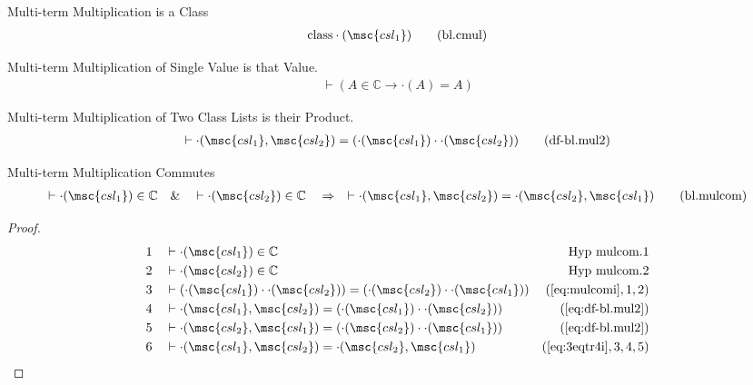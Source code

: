 \begin{metadefinition} Multi-term Multiplication is a Class
\begin{align}
{\rm class} \cdot( \msc{csl_1} )\label{eq:bl.cmul}\tag{bl.cmul}
\end{align}
\end{metadefinition}

\begin{metadefinition} Multi-term Multiplication of Single
Value is that Value.
\begin{align}
\vdash ( A \in \mathbb{C} \rightarrow \cdot( A ) = A
    )\label{eq:df-bl.mul1}\tag{df-bl.mul1}
\end{align}
\end{metadefinition}

\begin{metadefinition} Multi-term Multiplication of Two
Class Lists is their Product.
\begin{align}
\vdash \cdot( \msc{csl_1} , \msc{csl_2} ) = ( \cdot( \msc{csl_1} ) \cdot \cdot(
    \msc{csl_2} ) )\label{eq:df-bl.mul2}\tag{df-bl.mul2}
\end{align}
\end{metadefinition}

\begin{lemma} Multi-term Multiplication Commutes
\begin{align}
\vdash \cdot( \msc{csl_1} ) \in \mathbb{C}\quad\&\quad \vdash \cdot(
    \msc{csl_2} ) \in \mathbb{C}\quad\Rightarrow\quad \vdash \cdot( \msc{csl_1}
    , \msc{csl_2} ) = \cdot( \msc{csl_2} , \msc{csl_1}
    )\label{eq:bl.mulcom}\tag{bl.mulcom}
\end{align}
\end{lemma}

\begin{proof}
\begin{align}
  1 &&  & \vdash \cdot( \msc{csl_1} ) \in \mathbb{C}&\text{Hyp~mulcom.1}\notag%
  \\ 2 &&  & \vdash \cdot( \msc{csl_2} ) \in \mathbb{C}&\text{Hyp~mulcom.2}\notag%
  \\ 3 &&  & \vdash ( \cdot( \msc{csl_1} ) \cdot \cdot( \msc{csl_2} ) ) = ( \cdot( \msc{csl_2} ) \cdot \cdot( \msc{csl_1} ) )&(\mbox{\ref{eq:mulcomi}},1,2)\notag
  \\ 4 &&  & \vdash \cdot( \msc{csl_1} , \msc{csl_2} ) = ( \cdot( \msc{csl_1} ) \cdot \cdot( \msc{csl_2} ) )&(\mbox{\ref{eq:df-bl.mul2}})\notag
  \\ 5 &&  & \vdash \cdot( \msc{csl_2} , \msc{csl_1} ) = ( \cdot( \msc{csl_2} ) \cdot \cdot( \msc{csl_1} ) )&(\mbox{\ref{eq:df-bl.mul2}})\notag
  \\ 6 &&  & \vdash \cdot( \msc{csl_1} , \msc{csl_2} ) = \cdot( \msc{csl_2} , \msc{csl_1} )&(\mbox{\ref{eq:3eqtr4i}},3,4,5)\notag
\end{align}
\end{proof}

